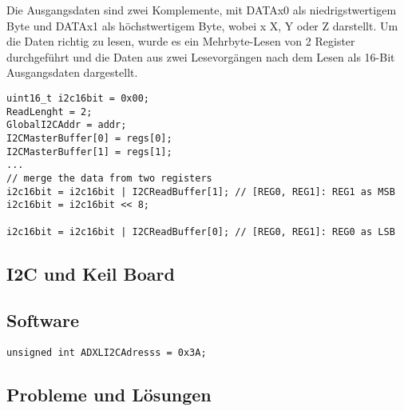 Die Ausgangsdaten sind zwei Komplemente, mit DATAx0 als niedrigstwertigem Byte und DATAx1 als höchstwertigem Byte, wobei x X, Y oder Z darstellt. Um die Daten richtig zu lesen, wurde es ein Mehrbyte-Lesen von 2 Register durchgeführt und die Daten aus zwei Lesevorgängen nach dem Lesen als 16-Bit Ausgangsdaten dargestellt. 

\begin{lstlisting}
uint16_t i2c16bit = 0x00;
ReadLenght = 2;
GlobalI2CAddr = addr;
I2CMasterBuffer[0] = regs[0];
I2CMasterBuffer[1] = regs[1];
...
// merge the data from two registers
i2c16bit = i2c16bit | I2CReadBuffer[1]; // [REG0, REG1]: REG1 as MSB
i2c16bit = i2c16bit << 8;

i2c16bit = i2c16bit | I2CReadBuffer[0]; // [REG0, REG1]: REG0 as LSB

\end{lstlisting}

\subsection{I2C und Keil Board}

\subsection{Software}

\begin{lstlisting}
unsigned int ADXLI2CAdresss = 0x3A;

\end{lstlisting}


\subsection{Probleme und Lösungen}